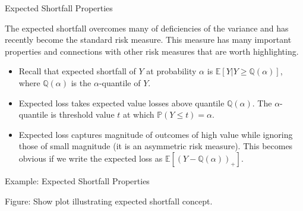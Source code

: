 \documentclass[9pt]{beamer}
\begin{document}
%
\begin{frame}{Expected Shortfall Properties}


The expected shortfall overcomes many of deficiencies of the variance and has recently become the standard risk measure.  This measure has many important properties and connections with other risk measures that are worth highlighting.  

\begin{itemize}
\item Recall that expected shortfall of $Y$ at probability $\alpha$ is $\mathbb{E}[Y|Y\geq \mathbb{Q}(\alpha)]$, where $\mathbb{Q}(\alpha)$ is the $\alpha$-quantile of $Y$. 

\item Expected loss takes expected value losses above quantile $\mathbb{Q}(\alpha)$. The  $\alpha$-quantile is threshold value $t$ at which $\mathbb{P}(Y\leq t)=\alpha$. 

\item Expected loss captures magnitude of outcomes of high value while ignoring those of small magnitude (it is an asymmetric risk measure). This becomes obvious if we write the expected loss as $\mathbb{E}[(Y-\mathbb{Q}(\alpha))_+]$. 

\end{itemize}



\end{frame}

%
\begin{frame}{Example: Expected Shortfall Properties}

\begin{block}{}
Figure: Show plot illustrating expected shortfall concept. 
\end{block}

\end{frame}
\end{document}
